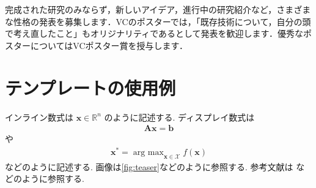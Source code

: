 \documentclass{vc}
\begin{document}
完成された研究のみならず，新しいアイデア，進行中の研究紹介など，さまざまな性格の発表を募集します．VCのポスターでは，「既存技術について，自分の頭で考え直したこと」もオリジナリティであるとして発表を歓迎します．優秀なポスターについてはVCポスター賞を授与します．

\section{テンプレートの使用例}

インライン数式は $\mathbf{x} \in \mathbb{R}^{n}$ のように記述する.
ディスプレイ数式は
\begin{align}
  \mathbf{A} \mathbf{x} = \mathbf{b}
\end{align}
や
\begin{align}
  \mathbf{x}^{*} = \mathop{\text{arg max}}_{\mathbf{x} \in \mathcal{X}} f(\mathbf{x})
\end{align}
などのように記述する.
画像は\autoref{fig:teaser}などのように参照する.
参考文献は \cite{GSC12,WL00} などのように参照する.

\small


\end{document}

